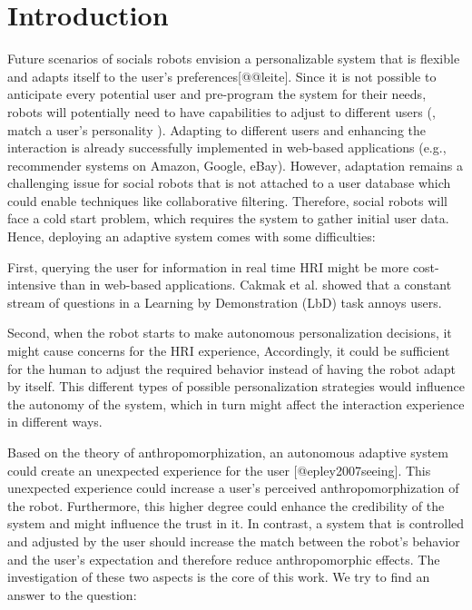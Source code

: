 \section{Introduction}
\label{intro}
Future scenarios of socials robots envision a personalizable system that is flexible and adapts itself to the user's preferences[@@leite].
Since it is not possible to anticipate every potential user and pre-program the system for their needs, robots will potentially need to have capabilities to adjust to different users (\eg{}, match a user's personality \cite{andrist2015look}). 
Adapting to different users and enhancing the interaction is already successfully implemented in web-based applications (e.g., recommender systems on Amazon, Google, eBay). However, adaptation remains a challenging issue for social robots that is not attached to a user database which could enable techniques like collaborative filtering. 
Therefore, social robots will face a cold start problem, which requires the system to gather initial user data. 
Hence, deploying an adaptive system comes with some difficulties: 

First, querying the user for information in real time HRI might be more cost-intensive than in web-based applications. 
Cakmak et al. \cite{cakmak2010designing} showed that a constant stream of questions in a Learning by Demonstration (LbD) task annoys users. 

Second, when the robot starts to make autonomous personalization decisions, it might cause concerns for the HRI experience, 
Accordingly, it could be sufficient for the human to adjust the required behavior instead of having the robot adapt by itself. 
This different types of possible personalization strategies would influence the autonomy of the system, which in turn might affect the interaction experience in different ways.

Based on the theory of anthropomorphization, an autonomous adaptive system could create an unexpected experience for the user [@epley2007seeing]. This unexpected experience could increase a user's perceived anthropomorphization of the robot. Furthermore, this higher degree could enhance the credibility of the system and might influence the trust in it. 
In contrast, a system that is controlled and adjusted by the user should increase the match between the robot's behavior and the user's expectation and therefore reduce anthropomorphic effects. 
The investigation of these two aspects is the core of this work. We try to find an answer to the question: 

